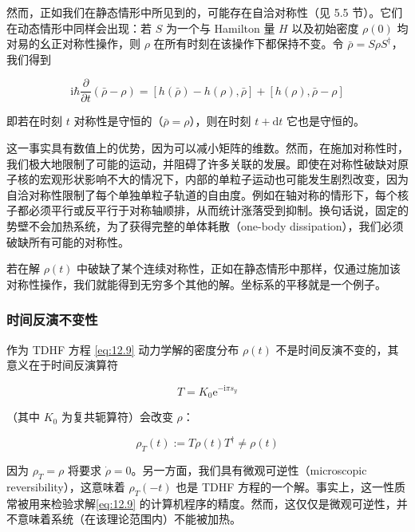 然而，正如我们在静态情形中所见到的，可能存在自洽对称性（见 5.5 节）。它们在动态情形中同样会出现：若 $S$ 为一个与 Hamilton
量 $H$ 以及初始密度 $\rho(0)$ 均对易的幺正对称性操作，则 $\rho$ 在所有时刻在该操作下都保持不变。令 $\bar{\rho}=S\rho S^{\dagger}$，我们得到

\begin{equation}
\mathrm{i}\hbar\frac{\partial}{\partial t}(\bar{\rho}-\rho)=[h(\bar{\rho})-h(\rho),\bar{\rho}]+[h(\rho),\bar{\rho}-\rho]\label{eq:12.25}
\end{equation}

即若在时刻 $t$ 对称性是守恒的（$\bar{\rho}=\rho$），则在时刻 $t+\mathrm{d}t$ 它也是守恒的。

这一事实具有数值上的优势，因为可以减小矩阵的维数。然而，在施加对称性时，我们极大地限制了可能的运动，并阻碍了许多关联的发展。即使在对称性破缺对原子核的宏观形状影响不大的情况下，内部的单粒子运动也可能发生剧烈改变，因为自洽对称性限制了每个单独单粒子轨道的自由度。例如在轴对称的情形下，每个核子都必须平行或反平行于对称轴顺排，从而统计涨落受到抑制。换句话说，固定的势壁不会加热系统，为了获得完整的单体耗散（one-body
dissipation），我们必须破缺所有可能的对称性。

若在解 $\rho(t)$ 中破缺了某个连续对称性，正如在静态情形中那样，仅通过施加该对称性操作，我们就能得到无穷多个其他的解。坐标系的平移就是一个例子。

\subsubsection{时间反演不变性\label{subsubsec:12.2.2.6}}

作为 TDHF 方程 \ref{eq:12.9} 动力学解的密度分布 $\rho(t)$ 不是时间反演不变的，其意义在于时间反演算符
\cite[第十五章]{Me61}

\begin{equation}
T=K_{0}\mathrm{e}^{-\mathrm{i}\pi s_{y}}\label{eq:12.26}
\end{equation}

（其中 $K_{0}$ 为复共轭算符）会改变 $\rho$：

\begin{equation}
\rho_{T}(t):=T\rho(t)T^{\dagger}\neq\rho(t)\label{eq:12.27}
\end{equation}

因为 $\rho_{T}=\rho$ 将要求 $\dot{\rho}=0$。另一方面，我们具有微观可逆性（microscopic
reversibility），这意味着 $\rho_{T}(-t)$ 也是 TDHF 方程的一个解。事实上，这一性质常被用来检验求解\ref{eq:12.9}
的计算机程序的精度。然而，这仅仅是微观可逆性，并不意味着系统（在该理论范围内）不能被加热。

